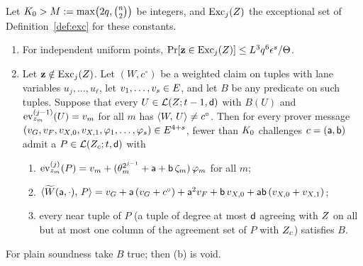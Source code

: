 \begin{lemma}\label{lem:F}
Let $K_0>M:=\max\bigl(2q,\binom{n}{2}\bigr)$ be integers, and $\operatorname{Exc}_j(Z)$ the exceptional set of Definition~\ref{def:exc} for these constants.
\begin{enumerate}[itemsep=1pt,topsep=2pt,label=\textnormal{(\arabic*)}]
\item For independent uniform points, $\Pr[\mathbf z\in\operatorname{Exc}_j(Z)]\le L^3q^6\epsilon^s/\Theta$.
\item Let $\mathbf z\notin\operatorname{Exc}_j(Z)$. Let $(W,c^\circ)$ be a weighted claim on tuples with lane variables $u_j,\dots,u_\ell$, let $v_1,\dots,v_s\in E$, and let $B$ be any predicate on such tuples. Suppose that every $U\in\mathcal{L}(Z;t-1,\mathsf{d})$ with $B(U)$ and $\operatorname{ev}^{(j-1)}_{z_m}(U)=v_m$ for all $m$ has $\langle W,\, U \rangle\ne c^\circ$. Then for every prover message $(v_G,v_F,v_{X,0},v_{X,1},\varphi_1,\dots,\varphi_s)\in E^{4+s}$, fewer than $K_0$ challenges $c=(\mathsf{a},\mathsf{b})$ admit a $P\in\mathcal{L}(Z_c;t,\mathsf{d})$ with
\begin{enumerate}[itemsep=0pt,topsep=1pt,label=\textnormal{(\alph*)}]
\item[\textnormal{(p)}] $\operatorname{ev}^{(j)}_{z_m}(P)=v_m+(\theta_m^{2^{j-1}}+\mathsf{a}+\mathsf{b}\,\zeta_m)\,\varphi_m$ for all $m$;
\item[\textnormal{(w)}] $\langle \widetilde{W}(\mathsf{a},\cdot),\, P \rangle=v_G+\mathsf{a}\,(v_G+c^\circ)+\mathsf{a}^2v_F+\mathsf{b}\,v_{X,0}+\mathsf{a}\mathsf{b}\,(v_{X,0}+v_{X,1})$;
\item[\textnormal{(b)}] every near tuple of $P$ (a tuple of degree at most $\mathsf{d}$ agreeing with $Z$ on all but at most one column of the agreement set of $P$ with $Z_c$) satisfies $B$.
\end{enumerate}
\end{enumerate}
For plain soundness take $B$ true; then \textnormal{(b)} is void.
\end{lemma}
